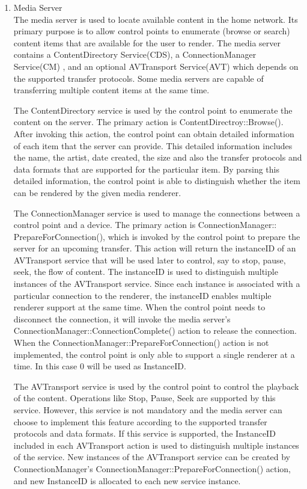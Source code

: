 \begin{enumerate} 
\item Media Server \\ 
The media server is used to locate available content in the home network. Its 
primary purpose is to allow control points to enumerate (browse or search) 
content items that are available for the user to render. The media server 
contains a ContentDirectory Service(CDS), a ConnectionManager Service(CM) 
, and an optional AVTransport Service(AVT) which depends on the supported 
transfer protocols. Some media servers are capable of transferring multiple 
content items at the same time. 

The ContentDirectory service is used by the control point to enumerate the content 
on the server. The primary action is ContentDirectroy::Browse(). After 
invoking this action, the control point can obtain detailed information of each 
item that the server can provide. This detailed information includes the name, 
the artist, date created, the size and also the transfer protocols and data formats that are
supported for the particular item. By parsing this detailed information, 
the control point is able to distinguish whether the item can be rendered by the 
given media renderer. 

The ConnectionManager service is used to manage the connections between a 
control point and a device. The primary action is 
ConnectionManager:: PrepareForConnection(), which is invoked by the control 
point to prepare the server for an upcoming transfer. This 
action will return the instanceID of an AVTransport service that will be used 
later to control, say to stop, pause, seek, the flow of content. The instanceID is used to distinguish multiple instances of the AVTransport service. Since each instance is associated with a particular connection to the renderer, the instanceID enables multiple renderer support at the same time. When the 
control point needs to disconnect the connection, it will invoke the media 
server's ConnectionManager::ConnectionComplete() action to release the 
connection. When the ConnectionManager::PrepareForConnection() action is not 
implemented, the control point is only able to support a single renderer at a 
time. In this case 0 will be used as InstanceID. 

The AVTransport service is used by the control point to control the playback of the 
content. Operations like Stop, Pause, Seek are supported by this service. However, this 
service is not mandatory and the media server can choose to implement this feature 
according to the supported transfer protocols and data formats. If this service 
is supported, the InstanceID included in each AVTransport action is used to 
distinguish multiple instances of the service. New instances of the AVTransport 
service can be created by ConnectionManager's 
ConnectionManager::PrepareForConnection() action, and new InstanceID is 
allocated to each new service instance. 


\end{enumerate}
